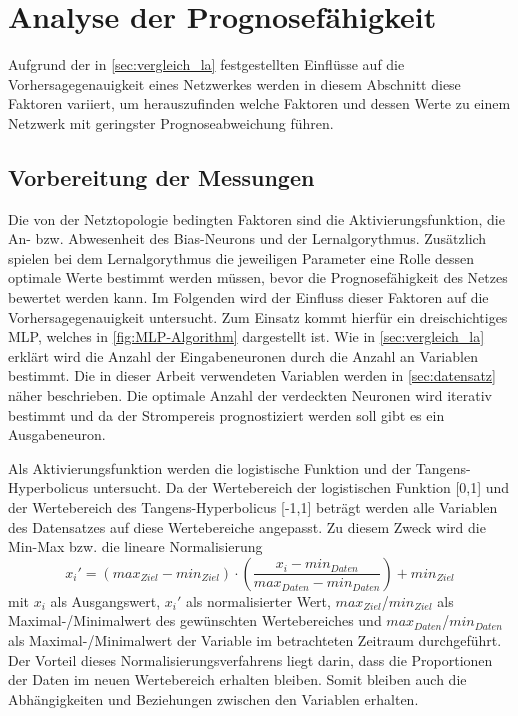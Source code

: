 

\section{Analyse der Prognosefähigkeit}\label{sec:analyse}

Aufgrund der in \autoref{sec:vergleich_la} festgestellten Einflüsse auf die Vorhersagegenauigkeit eines Netzwerkes werden in diesem Abschnitt diese Faktoren variiert, um herauszufinden welche Faktoren und dessen Werte zu einem Netzwerk mit geringster Prognoseabweichung führen.



\subsection{Vorbereitung der Messungen}

Die von der Netztopologie bedingten Faktoren sind die Aktivierungsfunktion, die An- bzw. Abwesenheit des Bias-Neurons und der Lernalgorythmus. Zusätzlich spielen bei dem Lernalgorythmus die jeweiligen Parameter eine Rolle dessen optimale Werte bestimmt werden müssen, bevor die Prognosefähigkeit des Netzes bewertet werden kann.
Im Folgenden wird der Einfluss dieser Faktoren auf die Vorhersagegenauigkeit untersucht. Zum Einsatz kommt hierfür ein dreischichtiges MLP, welches in \autoref{fig:MLP-Algorithm} dargestellt ist. Wie in \autoref{sec:vergleich_la} erklärt wird die Anzahl der Eingabeneuronen durch die Anzahl an Variablen bestimmt. Die in dieser Arbeit verwendeten Variablen werden in \autoref{sec:datensatz} näher beschrieben. Die optimale Anzahl der verdeckten Neuronen wird iterativ bestimmt und da der Strompereis prognostiziert werden soll gibt es ein Ausgabeneuron. 

Als Aktivierungsfunktion werden die logistische Funktion und der Tangens-Hyperbolicus untersucht. Da der Wertebereich der logistischen Funktion [0,1] und der Wertebereich des Tangens-Hyperbolicus [-1,1] beträgt werden alle Variablen des Datensatzes auf diese Wertebereiche angepasst. Zu diesem Zweck wird die Min-Max bzw. die lineare Normalisierung
\begin{equation}
x_i'=(max_{Ziel} - min_{Ziel}) \cdot \left ( \frac{x_i-min_{Daten}}{max_{Daten}-min_{Daten}} \right ) + min_{Ziel}
\label{gl:norm}
\end{equation}
mit $x_i$ als Ausgangswert, $x_i'$ als normalisierter Wert, $max_{Ziel}$/$min_{Ziel}$ als Maximal-/Minimalwert des gewünschten Wertebereiches und $max_{Daten}$/$min_{Daten}$ als Maximal-/Minimalwert der Variable im betrachteten Zeitraum durchgeführt. Der Vorteil dieses Normalisierungsverfahrens liegt darin, dass die Proportionen der Daten im neuen Wertebereich erhalten bleiben. Somit bleiben auch die Abhängigkeiten und Beziehungen zwischen den Variablen erhalten.\, 


